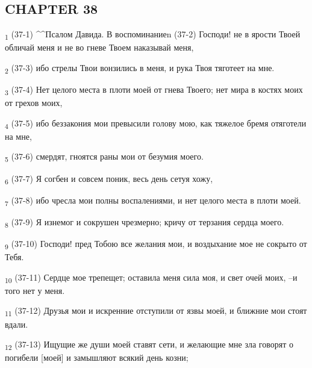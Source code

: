 \subsection{CHAPTER 38}
\begin{tcolorbox}
\textsubscript{1} (37-1) ^^Псалом Давида. В воспоминание^^. (37-2) Господи! не в ярости Твоей обличай меня и не во гневе Твоем наказывай меня,
\end{tcolorbox}
\begin{tcolorbox}
\textsubscript{2} (37-3) ибо стрелы Твои вонзились в меня, и рука Твоя тяготеет на мне.
\end{tcolorbox}
\begin{tcolorbox}
\textsubscript{3} (37-4) Нет целого места в плоти моей от гнева Твоего; нет мира в костях моих от грехов моих,
\end{tcolorbox}
\begin{tcolorbox}
\textsubscript{4} (37-5) ибо беззакония мои превысили голову мою, как тяжелое бремя отяготели на мне,
\end{tcolorbox}
\begin{tcolorbox}
\textsubscript{5} (37-6) смердят, гноятся раны мои от безумия моего.
\end{tcolorbox}
\begin{tcolorbox}
\textsubscript{6} (37-7) Я согбен и совсем поник, весь день сетуя хожу,
\end{tcolorbox}
\begin{tcolorbox}
\textsubscript{7} (37-8) ибо чресла мои полны воспалениями, и нет целого места в плоти моей.
\end{tcolorbox}
\begin{tcolorbox}
\textsubscript{8} (37-9) Я изнемог и сокрушен чрезмерно; кричу от терзания сердца моего.
\end{tcolorbox}
\begin{tcolorbox}
\textsubscript{9} (37-10) Господи! пред Тобою все желания мои, и воздыхание мое не сокрыто от Тебя.
\end{tcolorbox}
\begin{tcolorbox}
\textsubscript{10} (37-11) Сердце мое трепещет; оставила меня сила моя, и свет очей моих, --и того нет у меня.
\end{tcolorbox}
\begin{tcolorbox}
\textsubscript{11} (37-12) Друзья мои и искренние отступили от язвы моей, и ближние мои стоят вдали.
\end{tcolorbox}
\begin{tcolorbox}
\textsubscript{12} (37-13) Ищущие же души моей ставят сети, и желающие мне зла говорят о погибели [моей] и замышляют всякий день козни;
\end{tcolorbox}
